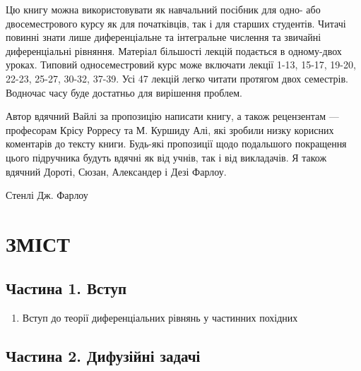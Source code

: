 Цю книгу можна використовувати як навчальний посібник для одно- або двосеместрового курсу як для початківців, так і для старших студентів. Читачі повинні знати лише диференціальне та інтегральне числення та звичайні диференціальні рівняння. Матеріал більшості лекцій подається в одному-двох уроках. Типовий односеместровий курс може включати лекції 1-13, 15-17, 19-20, 22-23, 25-27, 30-32, 37-39. Усі 47 лекцій легко читати протягом двох семестрів. Водночас часу буде достатньо для вирішення проблем.

Автор вдячний Вайлі за пропозицію написати книгу, а також рецензентам --- професорам Крісу Рорресу та М. Куршиду Алі, які зробили низку корисних коментарів до тексту книги. Будь-які пропозиції щодо подальшого покращення цього підручника будуть вдячні як від учнів, так і від викладачів. Я також вдячний Дороті, Сюзан, Александер і Дезі Фарлоу.

Стенлі Дж. Фарлоу

\section{ЗМІСТ}\label{ux437ux43cux456ux441ux442}

\subsection{Частина 1. Вступ}\label{ux447ux430ux441ux442ux438ux43dux430-1.-ux432ux441ux442ux443ux43f}

\begin{enumerate}
\def\labelenumi{\arabic{enumi}.}
\tightlist
\item
  Вступ до теорії диференціальних рівнянь у частинних похідних
\end{enumerate}

\subsection{Частина 2. Дифузійні задачі}\label{ux447ux430ux441ux442ux438ux43dux430-2.-ux434ux438ux444ux443ux437ux456ux439ux43dux456-ux437ux430ux434ux430ux447ux456}


